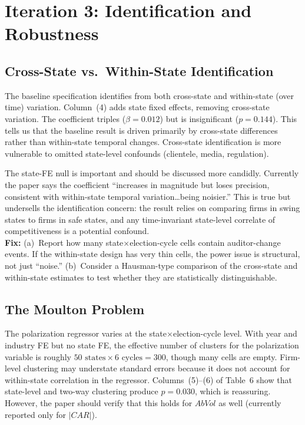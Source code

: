 \documentclass[11pt]{article}
\begin{document}
\section{Iteration 3: Identification and Robustness}
\label{sec:identification}

\subsection{Cross-State vs.\ Within-State Identification}

The baseline specification identifies from both cross-state and within-state (over time) variation. Column~(4) adds state fixed effects, removing cross-state variation. The coefficient triples ($\beta = 0.012$) but is insignificant ($p = 0.144$). This tells us that the baseline result is driven primarily by cross-state differences rather than within-state temporal changes. Cross-state identification is more vulnerable to omitted state-level confounds (clientele, media, regulation).

\begin{majorbox}
The state-FE null is important and should be discussed more candidly. Currently the paper says the coefficient ``increases in magnitude but loses precision, consistent with within-state temporal variation\ldots being noisier.'' This is true but undersells the identification concern: the result relies on comparing firms in swing states to firms in safe states, and any time-invariant state-level correlate of competitiveness is a potential confound.\\[4pt]
\textbf{Fix:} (a)~Report how many state$\times$election-cycle cells contain auditor-change events. If the within-state design has very thin cells, the power issue is structural, not just ``noise.'' (b)~Consider a Hausman-type comparison of the cross-state and within-state estimates to test whether they are statistically distinguishable.
\end{majorbox}

\subsection{The Moulton Problem}

The polarization regressor varies at the state$\times$election-cycle level. With year and industry FE but no state FE, the effective number of clusters for the polarization variable is roughly $50 \text{ states} \times 6 \text{ cycles} = 300$, though many cells are empty. Firm-level clustering may understate standard errors because it does not account for within-state correlation in the regressor. Columns~(5)--(6) of Table~6 show that state-level and two-way clustering produce $p = 0.030$, which is reassuring. However, the paper should verify that this holds for $AbVol$ as well (currently reported only for $|CAR|$).
\end{document}
